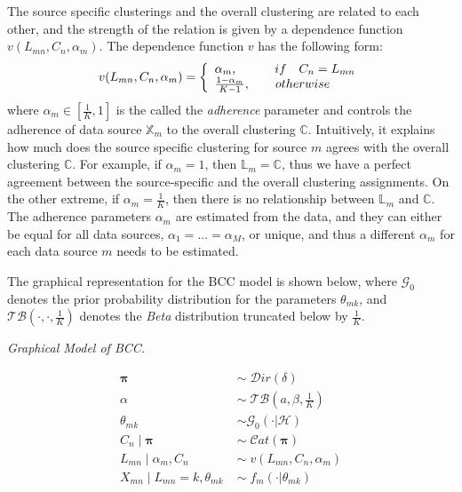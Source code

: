 The source specific clusterings and the overall clustering are related to each other, and the strength of the relation is given by a dependence function $v(L_{mn}, C_{n}, \alpha_{m})$. The dependence function $v$ has the following form:
\begin{equation}
	v(L_{mn}, C_{n}, \alpha_{m}) = \left\{
	\begin{array}{l l}
		\alpha_{m},\quad \quad \quad if\quad C_{n} = L_{mn}\\
		\frac{1-\alpha_{m}}{K-1},\quad \quad otherwise
	\end{array}\right.
\end{equation}
where $\alpha_{m} \in [\frac{1}{K}, 1]$ is the called the \emph{adherence} parameter and controls the adherence of data source $\mathbb{X}_m$ to the overall clustering $\mathbb{C}$. Intuitively, it explains how much does the source specific clustering for source $m$ agrees with the overall clustering $\mathbb{C}$. For example, if $\alpha_{m} = 1$, then $\mathbb{L}_{m} = \mathbb{C}$, thus we have a perfect agreement between the source-specific and the overall clustering assignments. On the other extreme, if $\alpha_{m} = \frac{1}{K}$, then there is no relationship between $\mathbb{L}_{m}$ and $\mathbb{C}$. The adherence parameters $\alpha_{m}$ are estimated from the data, and they can either be equal for all data sources, \ie $\alpha_{1} = ... = \alpha_{M}$, or unique, and thus a different $\alpha_{m}$ for each data source $m$ needs to be estimated. 


The graphical representation for the BCC model is shown below, where $\mathcal{G}_{0}$ denotes the prior probability distribution for the parameters $\theta_{mk}$, and $\mathcal{TB}(\cdot, \cdot, \frac{1}{K})$ denotes the \emph{Beta} distribution truncated below by $\frac{1}{K}$.

\vspace*{5mm}
\begin{minipage}{0.5\textwidth}%
  \hfill
  \begin{center}
	
	\emph{Graphical Model of BCC.}
  \end{center}
\end{minipage}
\begin{minipage}{0.4\textwidth}%
  \begin{equation*}
  	\begin{aligned}
  		\mathbf{\pi} \; & \sim \; \mathcal{D}ir(\delta) \\
  		\alpha \; & \sim \; \mathcal{TB}(\mathit{a}, \beta, \frac{1}{K}) \\
  		\theta_{mk} \; & \sim \mathcal{G}_{0}(\cdot | \mathcal{H}) \\
  		C_{n} \mid \mathbf{\pi} \; & \sim \; \mathcal{C}at(\mathbf{\pi}) \\
  		L_{mn} \mid \alpha_{m}, C_{n} \; & \sim \; v(L_{mn}, C_{n}, \alpha_{m}) \\
  		X_{mn} \mid L_{mn}=k,\theta_{mk} \; & \sim \; f_{m}(\cdot | \theta_{mk}) 
  	\end{aligned} 
  \end{equation*} 
\end{minipage}
\vspace*{5mm}

